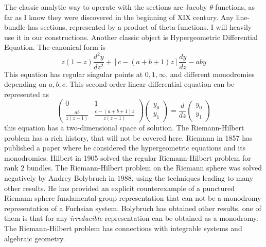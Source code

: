 \documentclass[../main.tex]{subfiles}
\begin{document}
    The classic analytic way to operate with the sections are
    Jacoby $\theta$-functions, as far as I know they
    were discovered in the beginning of XIX century.
    Any line-bundle has sections, represented by a product of theta-functions.
    I will heavily use it in our constructions.
    Another classic object is Hypergeometric Differential Equation.
    The canonical form is
    \[ z(1-z) \frac{d^2y}{dz^2} + [c-(a+b+1)z] \frac{dy}{dz} - aby\]
    This equation has regular singular points at $0,1, \infty$, and different
    monodromies depending on $a,b,c$.
    This second-order linear differential equation can be represented as
    \begin{equation}
        \begin{pmatrix}
            0 & 1 \\
            \frac{ab}{z(z-1)} & \frac{c - (a+b+1)z}{z(z-1)} 

        \end{pmatrix}  \begin{pmatrix} y_0 \\ y_1 
                           \end{pmatrix} = \frac{d}{dz} \begin{pmatrix} y_0 \\ y_1
                                               \end{pmatrix}
    \end{equation}
        this equation has a two-dimensional space of solution.
        The Riemann-Hilbert problem has a rich history, that will not be covered here.
        Riemann in 1857 has published a paper where he considered the hypergeometric
    equations and its monodromies.
        Hilbert in 1905 solved the regular Riemann-Hilbert problem
        for rank $2$ bundles.
    The Riemann-Hilbert problem on the Riemann
        sphere was solved negatively by Andrey Bolybruch in $1988$, using the techniques leading to many other results. \cite{Ilyashenko08lectureson}
    He has provided an explicit counterexample of a punctured Riemann sphere fundamental
    group representation that can not be a monodromy
    representation of a Fuchsian system.
    Bolybruch has obtained other results, one of them is that for
    any \textit{irreducible} representation can be obtained as a monodromy.
    The Riemann-Hilbert problem has connections with integrable systems \cite{fokas1991} and
    algebraic geometry.
\end{document}
